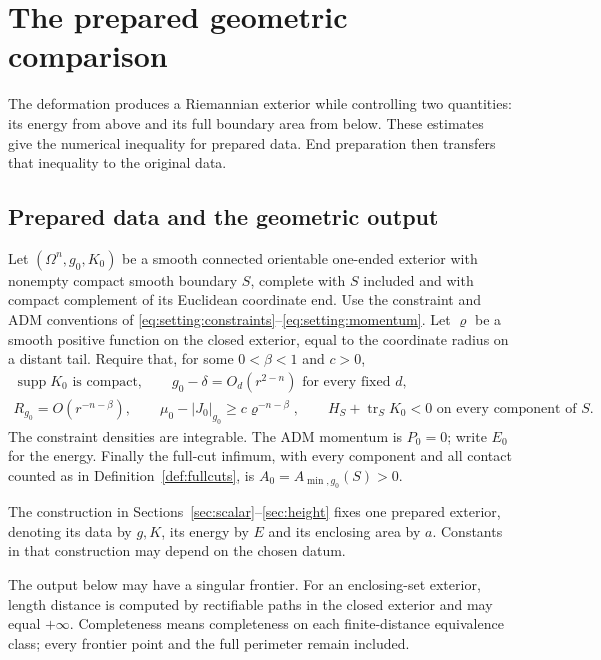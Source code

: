 \section{The prepared geometric comparison}
\label{sec:comparison}

The deformation produces a Riemannian exterior while controlling two
quantities: its energy from above and its full boundary area from below.
These estimates give the numerical inequality for prepared data. End
preparation then transfers that inequality to the original data.

\subsection{Prepared data and the geometric output}

\begin{definition}\label{def:prepared}
Let $(\Omega^n,g_0,K_0)$ be a smooth connected orientable one-ended
exterior with nonempty compact smooth boundary $S$, complete with $S$
included and with compact complement of its Euclidean coordinate end.
Use the constraint and ADM conventions of
\eqref{eq:setting:constraints}--\eqref{eq:setting:momentum}. Let $\varrho$ be a
smooth positive function on the closed exterior, equal to the coordinate
radius on a distant tail. Require that, for some $0<\beta<1$ and $c>0$,
\begin{equation}\label{eq:end:prepared}
\begin{gathered}
 \operatorname{supp}K_0\text{ is compact},\qquad
 g_0-\delta=O_d(r^{2-n})\text{ for every fixed }d,\\
 R_{g_0}=O(r^{-n-\beta}),\qquad
 \mu_0-|J_0|_{g_0}\ge c\varrho^{-n-\beta},\qquad
 H_S+\operatorname{tr}_S K_0<0\text{ on every component of }S.
\end{gathered}
\end{equation}
The constraint densities are integrable. The ADM momentum is $P_0=0$;
write $E_0$ for the energy. Finally the full-cut infimum, with every
component and all contact counted as in Definition~\ref{def:fullcuts}, is
$A_0=A_{\min,g_0}(S)>0$.
\end{definition}

The construction in Sections~\ref{sec:scalar}--\ref{sec:height} fixes
one prepared exterior, denoting its data by $g,K$, its energy by $E$
and its enclosing area by $a$. Constants in that construction may depend
on the chosen datum.

The output below may have a singular frontier. For an enclosing-set
exterior, length distance is computed by
rectifiable paths in the closed exterior and may equal $+\infty$.
Completeness means completeness on each finite-distance equivalence
class; every frontier point and the full perimeter remain included.

